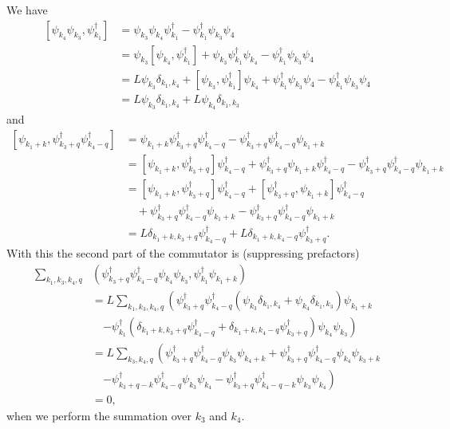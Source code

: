 \documentclass[11pt, a4paper]{report} %
\begin{document}
We have 
\begin{align}
  \label{eq:9}
  [\psi_{k_4}\psi_{k_3},\psi_{k_1}^{\dag}] &= \psi_{k_3}\psi_{k_4} \psi_{k_1}^{\dag} - \psi^{\dag}_{k_1} \psi_{k_3} \psi_4\\
                                           &= \psi_{k_3} [\psi_{k_4}, \psi_{k_1}^{\dag}] + \psi_{k_3} \psi_{k_1}^{\dag} \psi_{k_4} - \psi^{\dag}_{k_1} \psi_{k_3} \psi_4\\
                                           &= L\psi_{k_3} \delta_{k_1, k_4} + [\psi_{k_3}, \psi_{k_1}^{\dag}] \psi_{k_4} + \psi^{\dag}_{k_1} \psi_{k_3} \psi_4  - \psi^{\dag}_{k_1} \psi_{k_3} \psi_4\\
                                           &= L\psi_{k_3} \delta_{k_1, k_4} + L\psi_{k_4} \delta_{k_1,k_3}
\end{align}
and 
\begin{align}
  \label{eq:10}
  [\psi_{k_1+k},\psi_{k_3+q}^{\dag}\psi_{k_4-q}^{\dag}] &= \psi_{k_1+k}\psi_{k_3+q}^{\dag}\psi_{k_4-q}^{\dag} - \psi_{k_3+q}^{\dag}\psi_{k_4-q}^{\dag}\psi_{k_1+k}\\
                                                        & = [\psi_{k_1+k},\psi_{k_3+q}^{\dag}] \psi_{k_4-q}^{\dag} + \psi_{k_3+q}^{\dag} \psi_{k_1+k} \psi_{k_4-q}^{\dag} - \psi_{k_3+q}^{\dag}\psi_{k_4-q}^{\dag}\psi_{k_1+k}\\
                                                        &= [\psi_{k_1+k},\psi_{k_3+q}^{\dag}] \psi_{k_4-q}^{\dag} + [\psi_{k_3+q}^{\dag}, \psi_{k_1+k} ]\psi_{k_4-q}^{\dag} \nonumber\\
&\quad+ \psi_{k_3+q}^{\dag}\psi_{k_4-q}^{\dag}\psi_{k_1+k} - \psi_{k_3+q}^{\dag}\psi_{k_4-q}^{\dag}\psi_{k_1+k}\\
                                                        &= L\delta_{k_1+k,k_3+q} \psi_{k_4-q}^{\dag} + L\delta_{k_1+k,k_4-q} \psi_{k_3+q}^{\dag}.
\end{align}
With this the second part of the commutator is (suppressing prefactors)
\begin{align}
  \label{eq:11}
   \sum_{k_1,k_3,k_4,q}  &\left(\psi_{k_3+q}^{\dag}\psi_{k_4-q}^{\dag}\psi_{k_4}\psi_{k_3}, \psi_{k_1}^{\dag}\psi_{k_1+k}\right)\\
  &=L\sum_{k_1,k_3,k_4,q}  \left(\psi_{k_3+q}^{\dag}\psi_{k_4-q}^{\dag}(\psi_{k_3} \delta_{k_1, k_4} + \psi_{k_4} \delta_{k_1,k_3})\psi_{k_1+k} \right.\nonumber\\
 &\quad \left.  - \psi_{k_1}^{\dag}(\delta_{k_1+k,k_3+q} \psi_{k_4-q}^{\dag} + \delta_{k_1+k,k_4-q} \psi_{k_3+q}^{\dag})\psi_{k_4}\psi_{k_3}\right)\\
 &=L\sum_{k_3,k_4,q} \left( \psi_{k_3+q}^{\dag}\psi_{k_4-q}^{\dag}\psi_{k_3} \psi_{k_4+k} +  \psi_{k_3+q}^{\dag}\psi_{k_4-q}^{\dag}\psi_{k_4} \psi_{k_3+k}\right.\nonumber\\
 & \quad \left. -  \psi_{k_3+q-k}^{\dag}\psi_{k_4-q}^{\dag}\psi_{k_3} \psi_{k_4} - \psi_{k_3+q}^{\dag}\psi_{k_4-q-k}^{\dag}\psi_{k_3} \psi_{k_4}\right)\\
&= 0,
\end{align}
when we perform the summation over \(k_3\) and \(k_4\).
\end{document}
